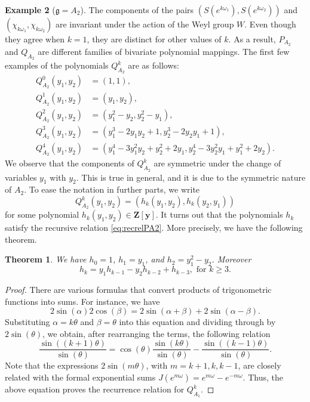 \documentclass{amsart}
\newcommand{\mf}{\mathfrak}
\newcommand{\mb}{\mathbf}
\newcommand{\Z}{\mathbf Z}
\numberwithin{equation}{section}
\theoremstyle{plain}
\newtheorem{theorem}{Theorem}
\theoremstyle{definition}
\newtheorem{example}[theorem]{Example}
\begin{document}
\begin{example}[$\mf{g}=A_2$]
The components of the pairs $(S(e^{k\omega_1}),S(e^{k\omega_2}))$ and $(\chi_{k\omega_1}, \chi_{k\omega_2})$ are invariant under the action of the Weyl group $W$. Even though they agree when $k=1$, they are distinct for other values of $k$. As a result, $P_{A_2}$ and $Q_{A_2}$ are different families of bivariate polynomial mappings. The first few examples of the polynomials $Q^k_{A_2}$ are as follows:
\begin{align*}
	Q_{A_2}^0(y_1,y_2)&=(1,1),\\
	Q_{A_2}^1(y_1,y_2)&=(y_1,y_2),\\
	Q_{A_2}^2(y_1,y_2)&=(y_1^2-y_2,y_2^2-y_1),\\
	Q_{A_2}^3(y_1,y_2)&=(y_1^3-2y_1y_2+1,y_2^3-2y_2y_1+1),\\
	Q_{A_2}^4(y_1,y_2)&=(y_1^4-3y_1^2y_2+y_2^2+2y_1 , y_2^4-3y_2^2y_1+y_1^2+2y_2).
\end{align*}
We observe that the components of $Q_{A_2}^k$ are symmetric under the change of variables $y_1$ with $y_2$. This is true in general, and it is due to the symmetric nature of $A_2$. To ease the notation in further parts, we write
\begin{equation}\label{eq:QA2symmetry}
Q_{A_2}^k(y_1,y_2)=(h_k(y_1,y_2),h_k(y_2,y_1))
\end{equation}
for some polynomial $h_k(y_1,y_2) \in \Z[\mb{y}]$. It turns out that the polynomials $h_k$ satisfy the recursive relation \eqref{eq:recrelPA2}. More precisely, we have the following theorem. 
\begin{theorem}\label{thm:A2recursion}
We have $h_0=1$, $h_1=y_1$, and $h_2=y_1^2-y_2$. Moreover
$$
h_k=y_1 h_{k-1}-y_2 h_{k-2}+h_{k-3},\text{ for }k\ge 3.
$$
\end{theorem}
\begin{proof}
There are various formulas that convert products of trigonometric functions into sums. For instance, we have $$2\sin(\alpha)2\cos(\beta)=2\sin(\alpha+\beta)+2\sin(\alpha-\beta).$$
Substituting $\alpha=k\theta$ and $\beta=\theta$ into this equation and dividing through by $2\sin(\theta)$, we obtain, after rearranging the terms, the following relation
$$\frac{\sin((k+1)\theta)}{\sin(\theta)} = \cos(\theta)\frac{\sin(k\theta)}{\sin(\theta)} -
\frac{\sin((k-1)\theta)}{\sin(\theta)}. $$
Note that the expressions $2\sin(m\theta)$, with $m=k+1,k,k-1$, are closely related with the formal exponential sums $J(e^{m\omega}) = e^{m\omega}-e^{-m\omega}$. Thus, the above equation proves the recurrence relation for $Q_{A_1}^k$.


\end{proof}
\end{example}
\end{document}
